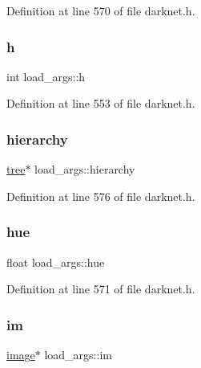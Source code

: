 Definition at line 570 of file darknet.\+h.

\mbox{\label{structload__args_a9cc50b164512ec4db097288e9d569729}} 
\subsubsection{\texorpdfstring{h}{h}}
{\footnotesize\ttfamily int load\+\_\+args\+::h}



Definition at line 553 of file darknet.\+h.

\mbox{\label{structload__args_a2c1866cf8b94474f3f8416a1e0f0cf91}} 
\subsubsection{\texorpdfstring{hierarchy}{hierarchy}}
{\footnotesize\ttfamily \mbox{\hyperlink{structtree}{tree}}$\ast$ load\+\_\+args\+::hierarchy}



Definition at line 576 of file darknet.\+h.

\mbox{\label{structload__args_a37e3681f1edc871b1e15432f08d00114}} 
\subsubsection{\texorpdfstring{hue}{hue}}
{\footnotesize\ttfamily float load\+\_\+args\+::hue}



Definition at line 571 of file darknet.\+h.

\mbox{\label{structload__args_ac821b75a2e615c801b67a73911dd0134}} 
\subsubsection{\texorpdfstring{im}{im}}
{\footnotesize\ttfamily \mbox{\hyperlink{structimage}{image}}$\ast$ load\+\_\+args\+::im}




